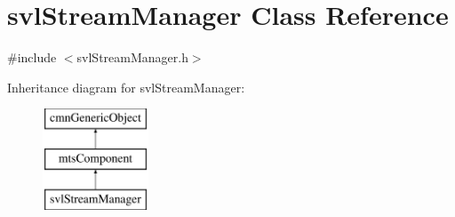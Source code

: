 \hypertarget{classsvl_stream_manager}{}\section{svl\+Stream\+Manager Class Reference}
\label{classsvl_stream_manager}


{\ttfamily \#include $<$svl\+Stream\+Manager.\+h$>$}

Inheritance diagram for svl\+Stream\+Manager\+:\begin{figure}[H]
\begin{center}
\leavevmode
\includegraphics[height=3.000000cm]{d1/dd6/classsvl_stream_manager}
\end{center}
\end{figure}
